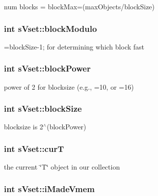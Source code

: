num blocks = block\-Max=(max\-Objects/block\-Size) 

\subsubsection[{block\-Modulo}]{\setlength{\rightskip}{0pt plus 5cm}int s\-Vset\-::block\-Modulo}\label{a00006_a0b9f1625bf97c1abae2db0346295855b}


=block\-Size-\/1; for determining which block fast 

\subsubsection[{block\-Power}]{\setlength{\rightskip}{0pt plus 5cm}int s\-Vset\-::block\-Power}\label{a00006_add65a271783642c1f7b8b3d872341752}


power of 2 for blocksize (e.\-g., =10, or =16) 

\subsubsection[{block\-Size}]{\setlength{\rightskip}{0pt plus 5cm}int s\-Vset\-::block\-Size}\label{a00006_a5882d40eb0e55fce8c7a8ca9c81bd762}


blocksize is 2$^\wedge$(block\-Power) 

\subsubsection[{cur\-T}]{\setlength{\rightskip}{0pt plus 5cm}int s\-Vset\-::cur\-T}\label{a00006_a9ae2055f85dfdf8a38382e2411e998aa}


the current \char`\"{}\-T\char`\"{} object in our collection 

\subsubsection[{i\-Made\-Vmem}]{\setlength{\rightskip}{0pt plus 5cm}int s\-Vset\-::i\-Made\-Vmem}\label{a00006_a3e514600e95b3a94ba65bd4954965b97}


